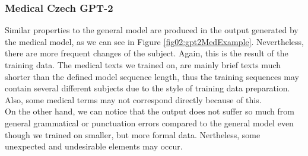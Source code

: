 \subsubsection*{Medical Czech GPT-2}
Similar properties to the general model are produced in the output generated by the medical model, as we can see in Figure \ref{fig02:gpt2MedExample}. Nevertheless, there are more frequent changes of the subject. Again, this is the result of the training data. The medical texts we trained on, are mainly brief texts much shorter than the defined model sequence length, thus the training sequences may contain several different subjects due to the style of training data preparation. Also, some medical terms may not correspond directly because of this. \\

On the other hand, we can notice that the output does not suffer so much from general grammatical or punctuation errors compared to the general model even though we trained on smaller, but more formal data. Nertheless, some unexpected and undesirable elements may occur.\\

